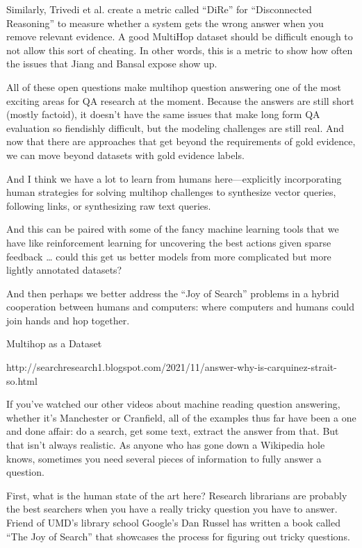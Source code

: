 Similarly, Trivedi et al. create a metric called “DiRe” for “Disconnected Reasoning” to measure whether a system gets the wrong answer when you remove relevant evidence.  A good MultiHop dataset should be difficult enough to not allow this sort of cheating.  In other words, this is a metric to show how often the issues that Jiang and Bansal expose show up.

All of these open questions make multihop question answering one of the most exciting areas for QA research at the moment.  Because the answers are still short (mostly factoid), it doesn’t have the same issues that make long form QA evaluation so fiendishly difficult, but the modeling challenges are still real.  And now that there are approaches that get beyond the requirements of gold evidence, we can move beyond datasets with gold evidence labels.

And I think we have a lot to learn from humans here—explicitly incorporating human strategies for solving multihop challenges to synthesize vector queries, following links, or synthesizing raw text queries.

And this can be paired with some of the fancy machine learning tools that we have like reinforcement learning for uncovering the best actions given sparse feedback … could this get us better models from more complicated but more lightly annotated datasets?

And then perhaps we better address the “Joy of Search” problems in a hybrid cooperation between humans and computers: where computers and humans could join hands and hop together.



Multihop as a Dataset


http://searchresearch1.blogspot.com/2021/11/answer-why-is-carquinez-strait-so.html

If you’ve watched our other videos about machine reading question answering, whether it’s Manchester or Cranfield, all of the examples thus far have been a one and done affair: do a search, get some text, extract the answer from that.  But that isn’t always realistic.  As anyone who has gone down a Wikipedia hole knows, sometimes you need several pieces of information to fully answer a question.  

First, what is the human state of the art here?  Research librarians are probably the best searchers when you have a really tricky question you have to answer.  Friend of UMD’s library school Google’s Dan Russel has written a book called “The Joy of Search” that showcases the process for figuring out tricky questions.

